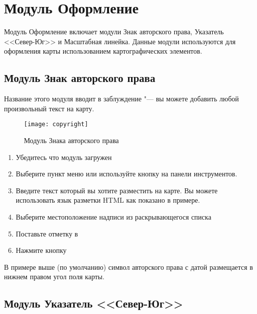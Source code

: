 
\section{Модуль Оформление}


Модуль Оформление включает модули Знак авторского права, Указатель
<<Север-Юг>> и Масштабная линейка. Данные модули используются для
оформления карты использованием картографических элементов.

\subsection{Модуль Знак авторского права}

Название этого модуля вводит в заблуждение "--- вы можете добавить любой
произвольный текст на карту.

\begin{figure}[ht]
   \centering
   \texttt{[image: copyright]}
   \caption{Модуль Знака авторского права \wincaption}\label{fig:copyright}
\end{figure}

\begin{enumerate}
\item Убедитесь что модуль загружен
\item Выберите пункт меню  \arrow {}
\arrow {} или
используйте кнопку 
на панели инструментов.
\item Введите текст который вы хотите разместить на карте. Вы можете
использовать язык разметки HTML как показано в примере.
\item Выберите местоположение надписи из раскрывающегося списка
\item Поставьте отметку в 
\item Нажмите кнопку 
\end{enumerate}

В примере выше (по умолчанию) символ авторского права с датой размещается
в нижнем правом угол поля карты.

\subsection{Модуль Указатель <<Север-Юг>>}

